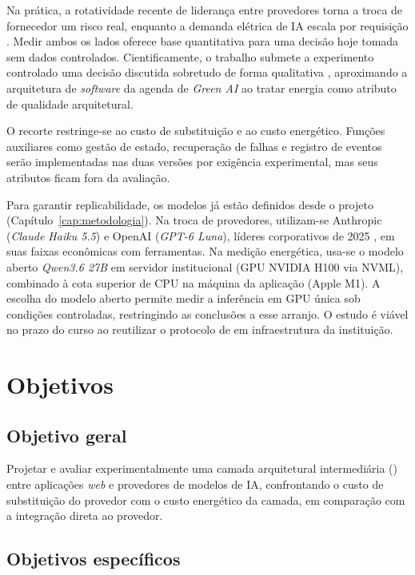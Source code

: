 Na prática, a rotatividade recente de liderança entre provedores
\cite{menlo2025} torna a troca de fornecedor um risco real, enquanto a demanda
elétrica de IA escala por requisição \cite{iea2025}. Medir ambos os lados
oferece base quantitativa para uma decisão hoje tomada sem dados controlados.
Cientificamente, o trabalho submete a experimento controlado
\cite{wohlin2024} uma decisão discutida sobretudo de forma qualitativa
\cite{liu2025}, aproximando a arquitetura de \textit{software} da agenda de
\textit{Green AI} \cite{schwartz2020} ao tratar energia como atributo de
qualidade arquitetural.

O recorte restringe-se ao custo de substituição e ao custo energético. Funções
auxiliares como gestão de estado, recuperação de falhas e registro de eventos
serão implementadas nas duas versões por exigência experimental, mas seus
atributos ficam fora da avaliação.

Para garantir replicabilidade, os modelos já estão definidos desde o projeto
(Capítulo~\ref{cap:metodologia}). Na troca de provedores, utilizam-se Anthropic
(\textit{Claude Haiku 5.5}) e OpenAI (\textit{GPT-6 Luna}), líderes corporativos
de 2025 \cite{menlo2025}, em suas faixas econômicas com ferramentas. Na
medição energética, usa-se o modelo aberto \textit{Qwen3.6 27B} em servidor
institucional (GPU NVIDIA H100 via NVML), combinado à cota superior de CPU na
máquina da aplicação (Apple M1). A escolha do modelo aberto permite medir a
inferência em GPU única sob condições controladas, restringindo as conclusões
a esse arranjo. O estudo é viável no prazo do curso ao reutilizar o protocolo
de  em infraestrutura da instituição.

\section{Objetivos}
\label{sec:objetivos}

\subsection{Objetivo geral}
\label{subsec:objetivo-geral}

Projetar e avaliar experimentalmente uma camada arquitetural intermediária
(\harness{}) entre aplicações \textit{web} e provedores de modelos de IA,
confrontando o custo de substituição do provedor com o custo energético da
camada, em comparação com a integração direta ao provedor.

\subsection{Objetivos específicos}
\label{subsec:objetivos-especificos}

